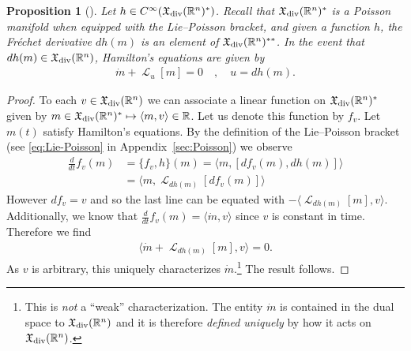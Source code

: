 \documentclass[12pt]{amsart}
\newcommand{\R}{\ensuremath{\mathbb{R}}}
\newtheorem{prop}[thm]{Proposition}
\DeclareMathOperator{\lie}{\mathcal{L}}
\begin{document}
  \begin{prop}[\cite{Arnold1966}] \label{prop:LPDiff}
  Let $h \in C^{\infty}( \mathfrak{X}_{\rm div}(\R^n)^* )$.
  Recall that $\mathfrak{X}_{\rm div}(\R^n)^*$ is a Poisson manifold
  when equipped with the Lie--Poisson bracket,
  and given a function $h$, the Fr\'echet derivative $dh(m)$ is an element  of $\mathfrak{X}_{\rm div}(\R^n)^{**}$.
  In the event that $dh(m) \in \mathfrak{X}_{\rm div}(\R^n)$,
  Hamilton's equations are given by
  \begin{align}
    \dot{m} + \lie_u [m] = 0 \quad , \quad u = dh(m) \label{eq:LP}.
  \end{align}
\end{prop}
\begin{proof}
  To each $v \in \mathfrak{X}_{\rm div}(\R^n)$
  we can associate a linear function on $\mathfrak{X}_{\rm div}(\R^n)^*$
  given by $m \in \mathfrak{X}_{\rm div}(\R^n)^* \mapsto \langle m , v \rangle \in \R$.
  Let us denote this function by $f_v$.
  Let $m(t)$ satisfy Hamilton's equations.
  By the definition of the Lie--Poisson bracket
  (see \eqref{eq:Lie-Poisson} in Appendix~\ref{sec:Poisson})
  we observe
  \begin{align*}
    \frac{d}{dt} f_v(m) &= \{ f_v , h \}(m) = \langle m , [ df_v(m) , dh(m) ] \rangle \\
    &= \langle m , \lie_{dh(m)}[ df_v(m) ] \rangle
  \end{align*}
  However $df_v = v$ and so
  the last line can be equated with  $-\langle \lie_{dh(m)}[m] , v \rangle$.
  Additionally, we know that $\frac{d}{dt} f_v(m) = \langle \dot{m} , v \rangle$ since $v$ is constant in time.
  Therefore we find
  \begin{align*}
    \langle \dot{m} + \lie_{dh(m)} [m] , v \rangle = 0.  
  \end{align*}
  As $v$ is arbitrary, this uniquely characterizes $\dot{m}$.\footnote{This is \emph{not} a ``weak'' characterization.  The entity $\dot{m}$ is
  contained in the dual space to $\mathfrak{X}_{\rm div}(\R^n)$ and it is
  therefore \emph{defined uniquely} by how it acts on $\mathfrak{X}_{\rm div}(\R^n)$.}
  The result follows.
\end{proof}
\end{document}

